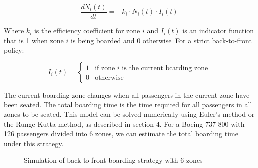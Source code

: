 \documentclass[12pt]{article}
\begin{document}
\begin{equation}
\frac{dN_i(t)}{dt} = -k_i \cdot N_i(t) \cdot I_i(t)
\end{equation}

Where $k_i$ is the efficiency coefficient for zone $i$ and $I_i(t)$ is an indicator function that is 1 when zone $i$ is being boarded and 0 otherwise. For a strict back-to-front policy:

\begin{equation}
I_i(t) = 
\begin{cases}
1 & \text{if zone $i$ is the current boarding zone} \\
0 & \text{otherwise}
\end{cases}
\end{equation}

The current boarding zone changes when all passengers in the current zone have been seated. The total boarding time is the time required for all passengers in all zones to be seated. This model can be solved numerically using Euler's method or the Runge-Kutta method, as described in section 4. For a Boeing 737-800 with 126 passengers divided into 6 zones, we can estimate the total boarding time under this strategy.

\begin{figure}[H]
\centering
{}
\caption{Simulation of back-to-front boarding strategy with 6 zones}
\end{figure}
\end{document}
